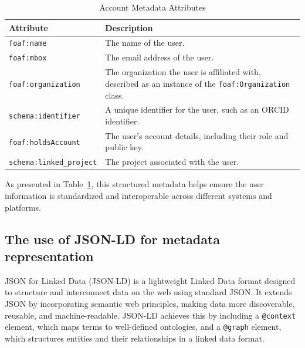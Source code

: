 \documentclass[final]{rc-book-2.14}
\begin{document}
\begin{table}[h]
    \centering
    \renewcommand{\arraystretch}{1.2}
    \begin{tabularx}{\textwidth}{|l|X|}
        \hline
        \textbf{Attribute}              & \textbf{Description}                                                                                            \\ \hline
        \texttt{foaf:name}              & The name of the user.                                                                                           \\ \hline
        \texttt{foaf:mbox}              & The email address of the user.                                                                                  \\ \hline
        \texttt{foaf:organization}      & The organization the user is affiliated with, described as an instance of the \texttt{foaf:Organization} class. \\ \hline
        \texttt{schema:identifier}      & A unique identifier for the user, such as an ORCID identifier.                                                  \\ \hline
        \texttt{foaf:holdsAccount}      & The user's account details, including their role and public key.                                                \\ \hline
        \texttt{schema:linked\_project} & The project associated with the user.                                                                           \\ \hline
    \end{tabularx}
    \caption{Account Metadata Attributes}
    \label{tab:user_metadata}
\end{table}

As presented in Table~\ref{tab:user_metadata}, this structured metadata helps ensure the user information is standardized and interoperable across different systems and platforms.


\subsection{The use of JSON-LD for metadata representation}

JSON for Linked Data (JSON-LD) is a lightweight Linked Data format designed to structure and interconnect data on the web using standard JSON. It extends JSON by incorporating semantic web principles, making data more discoverable, reusable, and machine-readable. JSON-LD achieves this by including a \texttt{@context} element, which maps terms to well-defined ontologies, and a \texttt{@graph} element, which structures entities and their relationships in a linked data format.
\end{document}
